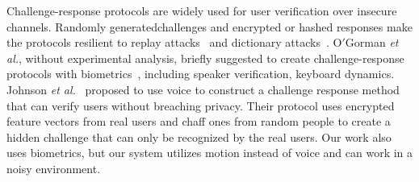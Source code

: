 Challenge-response protocols are widely used for user verification over insecure channels. Randomly generatedchallenges and encrypted or hashed responses make the protocols resilient to replay attacks~\cite{Securityforcomputernetworks} and dictionary attacks~\cite{Bellovin92encryptedkey}. %
O$'$Gorman \textit{et al.}, without experimental analysis, briefly suggested to create challenge-response protocols with biometrics~\cite{Gorman2003ComparingPasswords}, including speaker verification, keyboard dynamics.  %
Johnson \textit{et al.}~\cite{johnson2013SPIE} proposed to use voice to construct a challenge response method that can verify users without breaching privacy. Their protocol uses encrypted feature vectors from real users and chaff ones from random people to create a hidden challenge that can only be recognized by the real users. Our work also uses biometrics, but our system utilizes motion instead of voice and can work in a noisy environment. %

 


